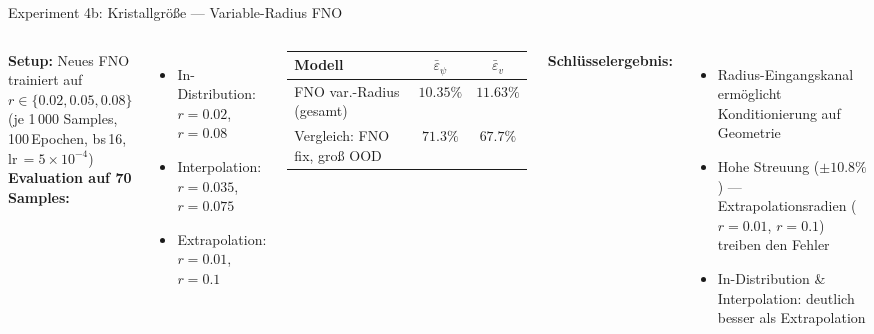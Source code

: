 \documentclass[aspectratio=169, 10pt]{beamer}
\begin{document}
\begin{frame}{Experiment 4b: Kristallgröße — Variable-Radius FNO}
\begin{columns}
\textbf{Setup:} Neues FNO trainiert auf $r\in\{0.02, 0.05, 0.08\}$\\
(je 1\,000 Samples, 100\,Epochen, bs\,16, lr\,$=5\times10^{-4}$)\\[6pt]

\textbf{Evaluation auf 70 Samples:}
\begin{itemize}
  \item In-Distribution: $r=0.02$, $r=0.08$
  \item Interpolation: $r=0.035$, $r=0.075$
  \item Extrapolation: $r=0.01$, $r=0.1$
\end{itemize}
\vspace{6pt}
\begin{table}
\small
\begin{tabular}{lcc}
\toprule
\textbf{Modell} & $\bar\varepsilon_\psi$ & $\bar\varepsilon_v$ \\
\midrule
FNO var.-Radius (gesamt) & $10.35\%$ & $11.63\%$ \\
\midrule
Vergleich: FNO fix, groß OOD & $71.3\%$ & $67.7\%$ \\
\bottomrule
\end{tabular}
\end{table}

\textbf{Schlüsselergebnis:}
\begin{itemize}
  \item Radius-Eingangskanal ermöglicht Konditionierung auf Geometrie
  \item Hohe Streuung ($\pm10.8\%$) — Extrapolationsradien ($r=0.01$, $r=0.1$) treiben den Fehler
  \item In-Distribution \& Interpolation: deutlich besser als Extrapolation
\end{itemize}
\end{columns}
\end{frame}
\end{document}
